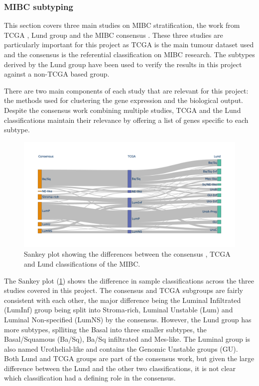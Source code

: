 \subsubsection{MIBC subtyping} \label{s:lit:subtypes_mibc}

This section covers three main studies on MIBC stratification, the work from TCGA \citet{Robertson2017-mg}, Lund group \cite{Marzouka2018-ge} and the MIBC consensus \cite{Kamoun2020-tj}. These three studies are particularly important for this project as TCGA is the main tumour dataset used and the consensus is the referential classification on MIBC research. The subtypes derived by the Lund group have been used to verify the results in this project against a non-TCGA based group.

There are two main components of each study that are relevant for this project: the methods used for clustering the gene expression and the biological output. Despite the consensus work combining multiple studies, TCGA and the Lund classifications maintain their relevance by offering a list of genes specific to each subtype. 

\begin{figure}[!htb]   
\centering
\includegraphics[width=1.0\textwidth,height=1.0\textheight,keepaspectratio]{Sections/Lit_review/Resources/classifier_differences.png}
  \caption{Sankey plot showing the differences between the consensus \citet{Kamoun2020-tj}, TCGA \citet{Robertson2017-mg} and Lund \citet{Marzouka2018-ge} classifications of the MIBC.}
\label{fig:lit:classifier_comp}
\end{figure}

The Sankey plot (\cref{fig:lit:classifier_comp}) shows the difference in sample classifications across the three studies covered in this project. The consensus and TCGA subgroups are fairly consistent with each other, the major difference being the Luminal Infiltrated (LumInf) group being split into Stroma-rich, Luminal Unstable (Lum) and Luminal Non-specified (LumNS) by the consensus. However, the Lund group has more subtypes, splliting the Basal into three smaller subtypes, the Basal/Squamous (Ba/Sq), Ba/Sq infiltrated and Mes-like. The Luminal group is also named Urothelial-like and contains the Genomic Unstable groups (GU). Both Lund and TCGA groups are part of the consensus work, but given the large difference between the Lund and the other two classifications, it is not clear which classification had a defining role in the consensus.


